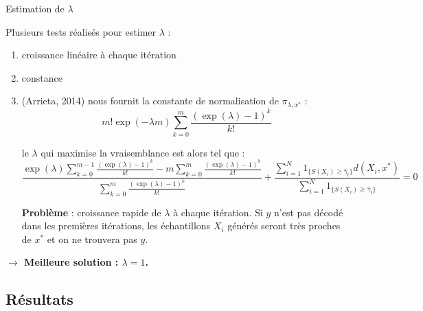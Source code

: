 \documentclass[10pt,xcolor=table,color={dvipsnames,usenames},ignorenonframetext,usepdftitle=false,french]{beamer}
\begin{document}
\begin{frame}{Estimation de \(\lambda\)}
\protect\hypertarget{estimation-de-lambda}{}

Plusieurs tests réalisés pour estimer \(\lambda\) :

\begin{enumerate}
\item croissance linéaire à chaque itération
\item constance

\pause 

\item (Arrieta, 2014) nous fournit la constante de normalisation de $\pi_{\lambda,x^*}$ :
$$
m!\exp(-\lambda m)\sum_{k=0}^{m}\frac{(\exp(\lambda)-1)^{k}}{k!}
$$

le $\lambda$ qui maximise la vraisemblance est alors tel que :
\footnotesize
$$
\frac{
\exp(\lambda)\sum_{k=0}^{m-1}\frac{(\exp(\lambda)-1)^{k}}{k!} -
m\sum_{k=0}^{m}\frac{(\exp(\lambda)-1)^{k}}{k!}
}{
\sum_{k=0}^{m}\frac{(\exp(\lambda)-1)^{k}}{k!}
} +
\frac{\sum_{i=1}^N 1_{\{S(X_{i})\geq\hat{\gamma}_{t}\}}d(X_i,x^*)}{\sum_{i=1}^N 1_{\{S(X_{i})\geq\hat{\gamma}_{t}\}}} = 0
$$
\normalsize

\textbf{Problème} : croissance rapide de $\lambda$ à chaque itération. Si $y$ n'est pas décodé dans les premières itérations, les échantillons $X_i$ générés seront très proches de $x^*$ et on ne trouvera pas $y$.
\end{enumerate}

\pause

\textbf{$\longrightarrow$ Meilleure solution : $\lambda = 1$.}

\end{frame}

\hypertarget{ruxe9sultats-3}{%
\subsection{Résultats}\label{ruxe9sultats-3}}
\end{document}
